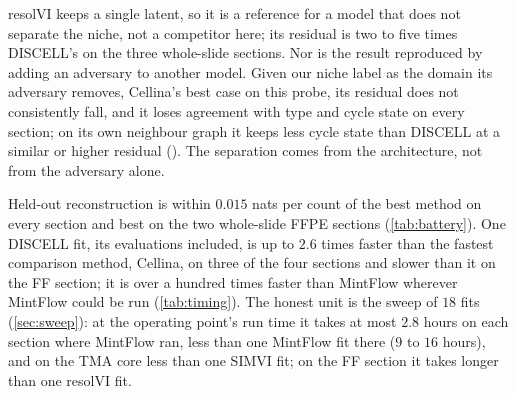 resolVI keeps a single latent, so it is a reference for a model that does not separate the niche, not a competitor here; its residual is two to five times DISCELL's on the three whole-slide sections. Nor is the result reproduced by adding an adversary to another model. Given our niche label as the domain its adversary removes, Cellina's best case on this probe, its residual does not consistently fall, and it loses agreement with type and cycle state on every section; on its own neighbour graph it keeps less cycle state than DISCELL at a similar or higher residual (). The separation comes from the architecture, not from the adversary alone.

Held-out reconstruction is within $0.015$ nats per count of the best method on every section and best on the two whole-slide FFPE sections (\cref{tab:battery}). One DISCELL fit, its evaluations included, is up to $2.6$ times faster than the fastest comparison method, Cellina, on three of the four sections and slower than it on the FF section; it is over a hundred times faster than MintFlow wherever MintFlow could be run (\cref{tab:timing}). The honest unit is the sweep of $18$ fits (\cref{sec:sweep}): at the operating point's run time it takes at most $2.8$ hours on each section where MintFlow ran, less than one MintFlow fit there ($9$ to $16$ hours), and on the TMA core less than one SIMVI fit; on the FF section it takes longer than one resolVI fit. 
